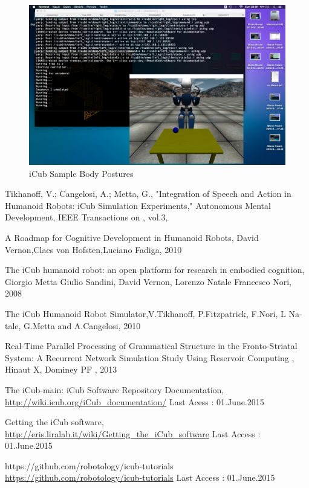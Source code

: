 \documentclass[a4paper, 12pt]{report}
\begin{document}
\begin{figure}[h!]
\centering
\includegraphics[width=1.0\linewidth]{neural}
\caption{iCub Sample Body Postures}
\label{fig:neural}
\end{figure}
\begin{thebibliography}{9}
  
  Tikhanoff, V.; Cangelosi, A.; Metta, G., 
  "Integration of Speech and Action in Humanoid Robots: iCub Simulation 
  Experiments," Autonomous Mental Development, IEEE Transactions on , vol.3,
  
   A Roadmap for Cognitive Development in Humanoid Robots, 
  David Vernon,Claes von Hofsten,Luciano Fadiga, 2010
  
   The iCub humanoid robot: an open platform for research in 
  embodied cognition, Giorgio Metta Giulio Sandini, David Vernon, Lorenzo Natale
  Francesco Nori, 2008
  
  The iCub Humanoid Robot Simulator,V.Tikhanoff, 
  P.Fitzpatrick, F.Nori, L Na- tale, G.Metta and A.Cangelosi, 2010
  
  Real-Time Parallel Processing of 
  Grammatical Structure in the Fronto-Striatal System: A Recurrent Network 
  Simulation Study Using Reservoir Computing , Hinaut X, Dominey PF , 2013
  
   The iCub-main: iCub Software Repository Documentation, 
  \url{http://wiki.icub.org/iCub_documentation/} Last Acess : 01.June.2015 
  
   Getting the iCub software, 
  \url{http://eris.liralab.it/wiki/Getting_the_iCub_software} Last Access : 
  01.June.2015
  
   https://github.com/robotology/icub-tutorials 
  \url{https://github.com/robotology/icub-tutorials} Last Access : 01.June.2015
  
  
\end{thebibliography}
\end{document}
